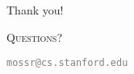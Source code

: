 \begin{frame}[fragile]{Thank you!}

\centering
\Large
\textsc{Questions?}

\textcolor{gray}{\small\texttt{mossr@cs.stanford.edu}}
    
\end{frame}